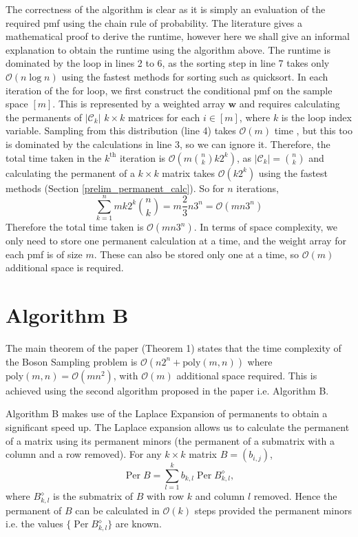 \documentclass[ %
                    author={Manan Vaswani},
                supervisor={Dr. Raphael Clifford},
                    degree={MEng},
                     title={A multi-core CPU implementation of the classical Boson Sampling algorithm},
                  subtitle={},
                      type={},
                      year={2019} ]{dissertation}
\theoremstyle{plain}
\theoremstyle{definition}
\DeclareMathOperator*{\Per}{\mathrm{Per}}
\begin{document}
The correctness of the algorithm is clear as it is simply an evaluation of the required pmf using the chain rule of probability. The literature gives a mathematical proof to derive the runtime, however here we shall give an informal explanation to obtain the runtime using the algorithm above. The runtime is dominated by the loop in lines 2 to 6, as the sorting step in line 7 takes only $\mathcal{O}(n \log n)$ using the fastest methods for sorting such as quicksort. In each iteration of the for loop, we first construct the conditional pmf on the sample space $[m]$. This is represented by a weighted array $\mathbf{w}$ and requires calculating the permanents of $\left|\mathcal{C}_k\right|$ $k \times k$ matrices for each $i \in [m]$, where $k$ is the loop index variable. Sampling from this distribution (line 4) takes $\mathcal{O}(m)$ time \cite{walker1974}, but this too is dominated by the calculations in line 3, so we can ignore it. Therefore, the total time taken in the $k^\text{th}$ iteration is $\mathcal{O}(m \binom{n}{k} k 2^k)$, as $\left|\mathcal{C}_k\right| = \binom{n}{k}$ and calculating the permanent of a $k \times k$ matrix takes $\mathcal{O}(k 2^k)$ using the fastest methods (Section \ref{prelim_permanent_calc}). So for $n$ iterations,
\begin{equation}
\sum_{k=1}^n m k 2^k \binom{n}{k} = m \frac{2}{3} n 3^n = \mathcal{O}(mn3^n)
\end{equation}
Therefore the total time taken is $\mathcal{O}(mn3^n)$. In terms of space complexity, we only need to store one permanent calculation at a time, and the weight array for each pmf is of size $m$. These can also be stored only one at a time, so $\mathcal{O}(m)$ additional space is required.


\section{Algorithm B} \label{sec:algB}
The main theorem of the paper \cite{clifford17} (Theorem 1) states that the time complexity of the Boson Sampling problem is $\mathcal{O}(n2^n + \text{poly}(m, n))$ where $ \text{poly}(m, n) = \mathcal{O}(mn^2)$, with $\mathcal{O}(m)$ additional space required. This is achieved using the second algorithm proposed in the paper i.e. Algorithm B.

Algorithm B makes use of the Laplace Expansion \cite{marcus_minc66} of permanents to obtain a significant speed up. The Laplace expansion allows us to calculate the permanent of a matrix using its permanent minors (the permanent of a submatrix with a column and a row removed). For any $k \times k$ matrix $B = (b_{i,j})$,
\begin{equation}
\Per B = \sum_{l=1}^k b_{k, l} \Per B_{k, l}^{\diamond},
\end{equation}
where $B_{k, l}^{\diamond}$  is the submatrix of $B$ with row $k$ and column $l$ removed. Hence the permanent of $B$ can be calculated in $\mathcal{O}(k)$ steps provided the permanent minors i.e. the values $\{ \Per B_{k, l}^{\diamond} \}$ are known.
\end{document}
